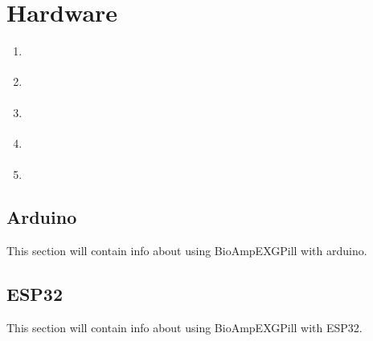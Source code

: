 \documentclass[a4paper,10pt,english,oneside]{sphinxmanual}
\begin{document}
\chapter{Hardware}
\label{\detokenize{hardware/index:hardware}}\label{\detokenize{hardware/index::doc}}\begin{enumerate}
%
\item {} 
\sphinxAtStartPar
{\hyperref[\detokenize{hardware/index:open10}]{}}

\item {} 
\sphinxAtStartPar
{\hyperref[\detokenize{hardware/index:open11}]{}}

\item {} 
\sphinxAtStartPar
{\hyperref[\detokenize{hardware/index:open12}]{}}

\item {} 
\sphinxAtStartPar
{\hyperref[\detokenize{hardware/index:open13}]{}}

\item {} 
\sphinxAtStartPar
{\hyperref[\detokenize{hardware/index:open14}]{}}

\end{enumerate}

\begin{DUlineblock}{0em}
\item[] 
\end{DUlineblock}


\section{Arduino}
\label{\detokenize{hardware/index:arduino}}\label{\detokenize{hardware/index:open10}}
\sphinxAtStartPar
This section will contain info about using Bio\sphinxhyphen{}Amp\sphinxhyphen{}EXG\sphinxhyphen{}Pill with arduino.

\begin{DUlineblock}{0em}
\item[] 
\end{DUlineblock}


\section{ESP32}
\label{\detokenize{hardware/index:esp32}}\label{\detokenize{hardware/index:open11}}
\sphinxAtStartPar
This section will contain info about using Bio\sphinxhyphen{}Amp\sphinxhyphen{}EXG\sphinxhyphen{}Pill with ESP32.
\end{document}
